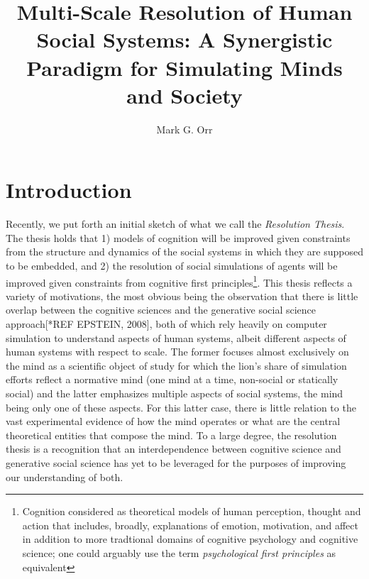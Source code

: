 \documentclass{article}
\title{Multi-Scale Resolution of Human Social Systems:  A Synergistic Paradigm for Simulating Minds and Society}
\author{Mark G. Orr}
\begin{document}
\maketitle

\section{Introduction}
Recently, we put forth an initial sketch of what we call the \textit{Resolution Thesis}\cite{orr2018_brims}.  The thesis holds that 1) models of cognition will be improved given constraints from the structure and dynamics of the social systems in which they are supposed to be embedded, and 2) the resolution of social simulations of agents will be improved given constraints from cognitive first principles\footnote{Cognition considered as theoretical models of human perception, thought and action that includes, broadly, explanations of emotion, motivation, and affect in addition to more tradtional domains of cognitive psychology and cognitive science; one could arguably use the term \textit{psychological first principles} as equivalent}.  This thesis reflects a variety of motivations, the most obvious being the observation that there is little overlap between the cognitive sciences and the generative social science approach[*REF EPSTEIN, 2008], both of which rely heavily on computer simulation to understand aspects of human systems, albeit different aspects of human systems with respect to scale.  The former focuses almost exclusively on the mind as a scientific object of study for which the lion's share of simulation efforts reflect a normative mind (one mind at a time, non-social or statically social) and the latter emphasizes multiple aspects of social systems, the mind being only one of these aspects.  For this latter case,  there is little relation to the vast experimental evidence of how the mind operates or what are the central theoretical entities that compose the mind.  To a large degree, the resolution thesis is a recognition that an interdependence between cognitive science and generative social science has yet to be leveraged for the purposes of improving our understanding of both.    
\end{document}
